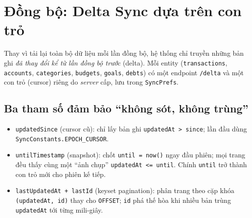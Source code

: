 \documentclass[11pt,a4paper]{article}
\begin{document}
\begin{center}
\end{center}

\section{Đồng bộ: Delta Sync dựa trên con trỏ}
\label{sec:sync}

Thay vì tải lại toàn bộ dữ liệu mỗi lần đồng bộ, hệ thống chỉ truyền những bản ghi
\emph{đã thay đổi kể từ lần đồng bộ trước} (delta). Mỗi entity
(\texttt{transactions}, \texttt{accounts}, \texttt{categories}, \texttt{budgets},
\texttt{goals}, \texttt{debts}) có một endpoint \texttt{/delta} và một con trỏ (cursor)
riêng do \emph{server} cấp, lưu trong \texttt{SyncPrefs}.

\subsection{Ba tham số đảm bảo ``không sót, không trùng''}

\begin{itemize}[leftmargin=2em]
  \item \texttt{updatedSince} (cursor cũ): chỉ lấy bản ghi \texttt{updatedAt > since};
        lần đầu dùng \texttt{SyncConstants.EPOCH\_CURSOR}.
  \item \texttt{untilTimestamp} (snapshot): chốt \texttt{until = now()} ngay đầu phiên;
        mọi trang đều thấy cùng một ``ảnh chụp'' \texttt{updatedAt <= until}. Chính
        \texttt{until} trở thành con trỏ mới cho phiên kế tiếp.
  \item \texttt{lastUpdatedAt + lastId} (keyset pagination): phân trang theo cặp khóa
        \texttt{(updatedAt, id)} thay cho \texttt{OFFSET}; \texttt{id} phá thế hòa khi
        nhiều bản trùng \texttt{updatedAt} tới từng mili-giây.
\end{itemize}
\end{document}
